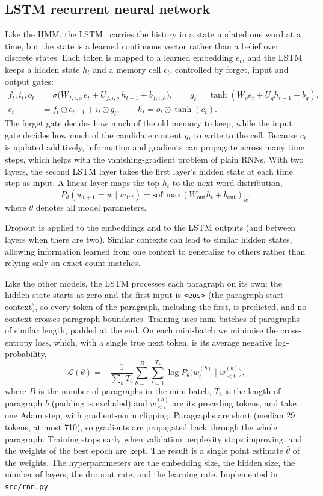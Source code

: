 \documentclass[11pt]{article}
\begin{document}
\subsection{LSTM recurrent neural network}

Like the HMM, the LSTM~\cite{hochreiter1997} carries the history in a
state updated one word at a time, but the state is a learned continuous
vector rather than a belief over discrete states. Each token is mapped to
a learned embedding $e_t$, and the LSTM keeps a hidden state $h_t$ and a
memory cell $c_t$, controlled by forget, input and output gates:
\[
\begin{aligned}
f_t, i_t, o_t &= \sigma\big(W_{f,i,o}\, e_t + U_{f,i,o}\, h_{t-1} + b_{f,i,o}\big),
\qquad g_t = \tanh(W_g e_t + U_g h_{t-1} + b_g), \\
c_t &= f_t \odot c_{t-1} + i_t \odot g_t, \qquad h_t = o_t \odot \tanh(c_t).
\end{aligned}
\]
The forget gate decides how much of the old memory to keep, while the
input gate decides how much of the candidate content $g_t$ to write to
the cell. Because $c_t$ is updated
additively, information and gradients can propagate across many time steps, which helps with the
vanishing-gradient problem of plain RNNs. With two layers, the second LSTM layer takes the first layer's hidden state at each time step as input. A linear layer maps the top $h_t$ to the next-word
distribution,
\[
P_\theta(w_{t+1} = w \mid w_{1:t}) = \mathrm{softmax}(W_{\text{out}} h_t + b_{\text{out}})_w ,
\]
where $\theta$ denotes all model parameters.

Dropout is applied to the embeddings and to the LSTM outputs (and between
layers when there are two). Similar contexts can lead to similar hidden
states, allowing information learned from one context to generalize to
others rather than relying only on exact count matches.

Like the other models, the LSTM processes each paragraph on
its own: the hidden state starts at zero and the first input is
\texttt{<eos>} (the paragraph-start context), so every token of the
paragraph, including the first, is predicted, and no context crosses
paragraph boundaries. 
Training uses mini-batches of paragraphs of similar length, padded at the end. On each mini-batch we minimise the
cross-entropy loss, which, with a single true next token, is its average
negative log-probability,
\[
\mathcal{L}(\theta) = -\frac{1}{\sum_b T_b}\sum_{b=1}^{B}\sum_{t=1}^{T_b}
\log P_\theta\big(w^{(b)}_{t} \mid w^{(b)}_{< t}\big),
\]
where $B$ is the number of paragraphs in the mini-batch, $T_b$ is the length of paragraph $b$ (padding is excluded) and
$w^{(b)}_{< t}$ are its preceding tokens, and take one Adam step, with gradient-norm clipping.
Paragraphs are short (median 29 tokens,
at most 710), so gradients are propagated back
through the whole paragraph. Training stops early when validation perplexity stops
improving, and the weights of the best epoch are kept. The result is a
single point estimate $\hat\theta$ of the weights.
The hyperparameters are the embedding size, the hidden size, the number
of layers, the dropout rate, and the learning rate. Implemented in \texttt{src/rnn.py}.
\end{document}
